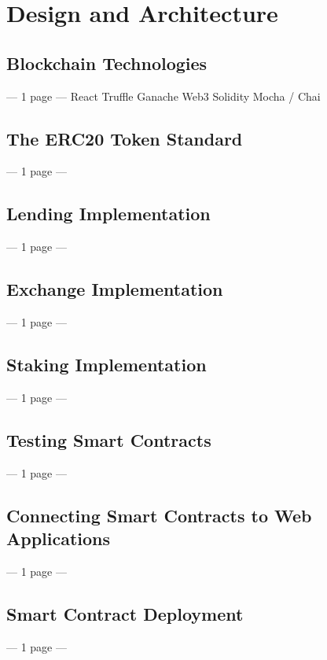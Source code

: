 \chapter{Design and Architecture}

\label{cha:DesignArchitecture}

\section{Blockchain Technologies}
--- 1 page ---
React
Truffle
Ganache
Web3
Solidity
Mocha / Chai

\section{The ERC20 Token Standard}
--- 1 page ---

\section{Lending Implementation}
--- 1 page ---

\section{Exchange Implementation}
--- 1 page ---

\section{Staking Implementation}
--- 1 page ---

\section{Testing Smart Contracts}
--- 1 page ---

\section{Connecting Smart Contracts to Web Applications}
--- 1 page ---

\section{Smart Contract Deployment}
--- 1 page ---
